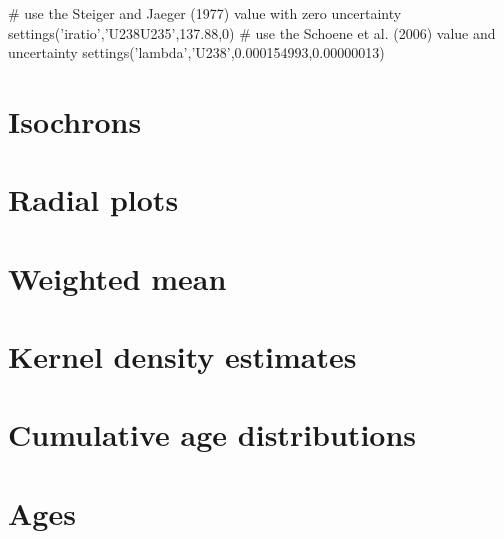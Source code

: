 \begin{refsection}
\begin{script}
# use the Steiger and Jaeger (1977) value with zero uncertainty
settings('iratio','U238U235',137.88,0)
# use the Schoene et al. (2006) value and uncertainty
settings('lambda','U238',0.000154993,0.00000013) 
\end{script}

\section{Isochrons}

\section{Radial plots}

\section{Weighted mean}

\section{Kernel density estimates}

\section{Cumulative age distributions}

\section{Ages}

\printbibliography[heading=subbibliography]

\end{refsection}
